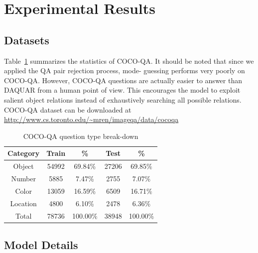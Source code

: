 \documentclass{article} %
\renewcommand{\#}[1]{\textbf{#1}}
\begin{document}
\section{Experimental Results}

\subsection{Datasets}

Table~\ref{tab:dataset_category_stats} summarizes the statistics of COCO-QA. It
should be noted that since we applied the QA pair rejection process, mode-
guessing performs very poorly on COCO-QA. However, COCO-QA questions are
actually easier to answer than DAQUAR from a human point of view. This
encourages the model to exploit salient object relations instead of
exhaustively searching all possible relations. COCO-QA dataset can be
downloaded at \url{http://www.cs.toronto.edu/~mren/imageqa/data/cocoqa}

\begin{table}
\caption{COCO-QA question type break-down}
\label{tab:dataset_category_stats}
\vskip 0.15in
\begin{center}
\begin{small}
\begin{sc}
\begin{tabular}{c c c c c}
\hline
Category & Train & \%       & Test  & \%       \\
\hline
Object   & 54992 & 69.84\%  & 27206 & 69.85\%  \\
Number   & 5885  & 7.47\%   & 2755  & 7.07\%   \\
Color    & 13059 & 16.59\%  & 6509  & 16.71\%  \\
Location & 4800  & 6.10\%   & 2478  & 6.36\%   \\
\hline
Total    & 78736 & 100.00\% & 38948 & 100.00\% \\
\hline
\end{tabular}
\end{sc}
\end{small}
\end{center}
\end{table}

\subsection{Model Details}
\end{document}
